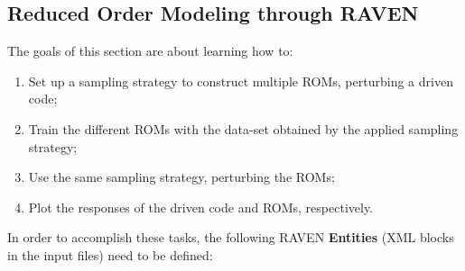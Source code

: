 \subsection{Reduced Order Modeling through RAVEN}
\label{subsub:ROMraven}
The goals of this section are about learning how to:
 \begin{enumerate}
   \item Set up a sampling strategy to construct multiple ROMs, perturbing a driven code;
   \item Train the different ROMs with the data-set obtained by the applied sampling strategy; 
   \item Use the same sampling strategy, perturbing the ROMs;
   \item Plot the responses of the driven code and ROMs, respectively.
\end{enumerate}  
In order to accomplish these tasks, the following RAVEN \textbf{Entities} (XML blocks in the input files) need to be defined:
